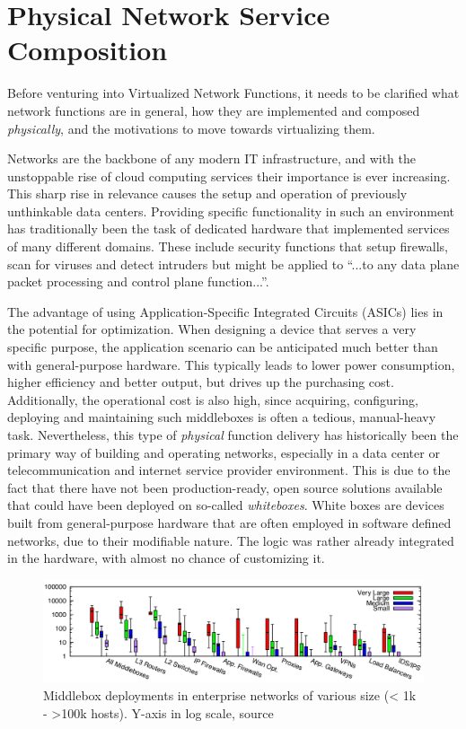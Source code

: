 \section{Physical Network Service Composition}
\label{sec:physical}
Before venturing into Virtualized Network Functions, it needs to be clarified what network functions are in general, how they are implemented and composed \textit{physically}, and the motivations to move towards virtualizing them. 

Networks are the backbone of any modern IT infrastructure, and with the unstoppable rise of cloud computing services their importance is ever increasing. This sharp rise in relevance causes the setup and operation of previously unthinkable data centers. Providing specific functionality in such an environment has traditionally been the task of dedicated hardware that implemented services of many different domains. These include security functions that setup firewalls, scan for viruses and detect intruders but might be applied to ``...to any data plane packet processing and control plane function...''\cite{nfv_wp}. 

The advantage of using Application-Specific Integrated Circuits (ASICs) lies in the potential for optimization. When designing a device that serves a very specific purpose, the application scenario can be anticipated much better than with general-purpose hardware. This typically leads to lower power consumption, higher efficiency and better output, but drives up the purchasing cost. Additionally, the operational cost is also high, since acquiring, configuring, deploying and maintaining such middleboxes is often a tedious, manual-heavy task. Nevertheless, this type of \textit{physical} function delivery has historically been the primary way of building and operating networks, especially in a data center or telecommunication and internet service provider environment. This is due to the fact that there have not been production-ready, open source solutions available that could have been deployed on so-called \textit{whiteboxes}. White boxes are devices built from general-purpose hardware that are often employed in software defined networks, due to their modifiable nature. The logic was rather already integrated in the hardware, with almost no chance of customizing it.

\begin{figure}[h]
	\centering
	\includegraphics[width=1\linewidth]{images/middleboxesNumbers.png}
	\caption{Middlebox deployments in enterprise networks of various size (< 1k - >100k hosts). Y-axis in log scale, source \cite{sherry2016middleboxes}}
	\label{img:middleboxesNumbers}
\end{figure}

